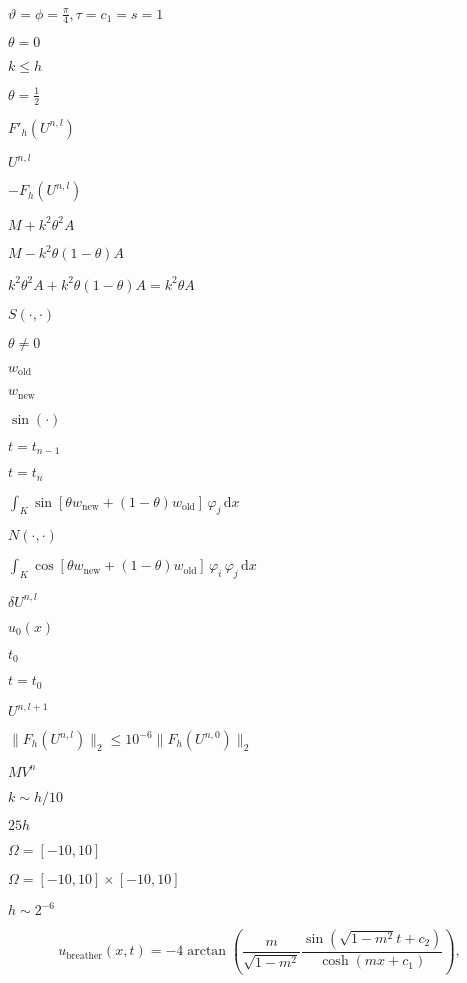 \documentclass{article}
\begin{document}
$\vartheta=\phi=\frac{\pi}{4}, \tau=c_1=s=1$
\pagebreak

$\theta = 0$
\pagebreak

$k \le h$
\pagebreak

$\theta = \frac{1}{2}$
\pagebreak

$F'_h(U^{n,l})$
\pagebreak

$U^{n,l}$
\pagebreak

$-F_h(U^{n,l})$
\pagebreak

$M+k^2\theta^2 A$
\pagebreak

$M-k^2\theta(1-\theta) A$
\pagebreak

$k^2\theta^2 A+k^2\theta(1-\theta) A=k^2\theta A$
\pagebreak

$S(\cdot,\cdot)$
\pagebreak

$\theta\ne 0$
\pagebreak

$w_{\mathrm{old}}$
\pagebreak

$w_{\mathrm{new}}$
\pagebreak

$\sin(\cdot)$
\pagebreak

$t=t_{n-1}$
\pagebreak

$t=t_n$
\pagebreak

$\int_K \sin\left[\theta w_{\mathrm{new}} + (1-\theta) w_{\mathrm{old}}\right] \,\varphi_j\,\mathrm{d}x$
\pagebreak

$N(\cdot,\cdot)$
\pagebreak

$\int_K \cos\left[\theta w_{\mathrm{new}} + (1-\theta) w_{\mathrm{old}}\right]\, \varphi_i\, \varphi_j\,\mathrm{d}x$
\pagebreak

$\delta U^{n,l}$
\pagebreak

$u_0(x)$
\pagebreak

$t_0$
\pagebreak

$t=t_0$
\pagebreak

$U^{n,l+1}$
\pagebreak

$\|F_h(U^{n,l})\|_2 \le 10^{-6} \|F_h(U^{n,0})\|_2$
\pagebreak

$MV^n$
\pagebreak

$k\sim h/10$
\pagebreak

$25h$
\pagebreak

$\Omega = [-10,10]$
\pagebreak

$\Omega = [-10,10]\times [-10,10]$
\pagebreak

$h\sim 2^{-6}$
\pagebreak

\[ u_{\mathrm{breather}}(x,t) = -4\arctan \left(\frac{m}{\sqrt{1-m^2}} \frac{\sin\left(\sqrt{1-m^2}t +c_2\right)}{\cosh(mx+c_1)} \right), \]
\pagebreak
\end{document}
